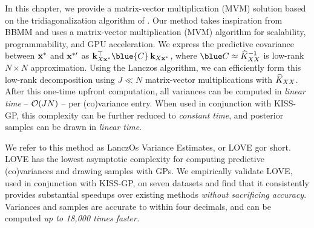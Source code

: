 In this chapter, we provide a matrix-vector multiplication (MVM) solution based on the tridiagonalization algorithm of \citet{lanczos1950iteration}.
Our method takes inspiration from BBMM and uses a matrix-vector multiplication (MVM) algorithm for scalability, programmability, and GPU acceleration.
We express the predictive covariance between $\mathbf{x}^*$ and $\mathbf{x}^{*\prime}$ as
$\bk_{\bX\bxtest}^\top \blue{\bC} \: \bk_{\bX\bxtest}$,
where $\blue \bC \approx \trainK^{-1}$ is low-rank $N \times N$ approximation.
Using the Lanczos algorithm, we can efficiently form this low-rank decomposition using $J \ll N$ matrix-vector multiplications with $\widehat{K}_{XX}$.
After this one-time upfront computation, all variances can be computed in \emph{linear time} -- $\bigo{JN}$ -- per (co)variance entry.
When used in conjunction with KISS-GP, this complexity can be further reduced to \emph{constant time}, and posterior samples can be drawn in \emph{linear time}.

We refer to this method as LanczOs Variance Estimates, or LOVE{} gor short.
LOVE{} has the lowest asymptotic complexity for computing predictive (co)variances and drawing samples with GPs.
We empirically validate LOVE{}, used in conjunction with KISS-GP, on seven datasets and find that it consistently provides substantial speedups over existing methods \emph{without sacrificing accuracy}.
Variances and samples are accurate to within four decimals, and can be computed \emph{up to 18,000 times faster.}
